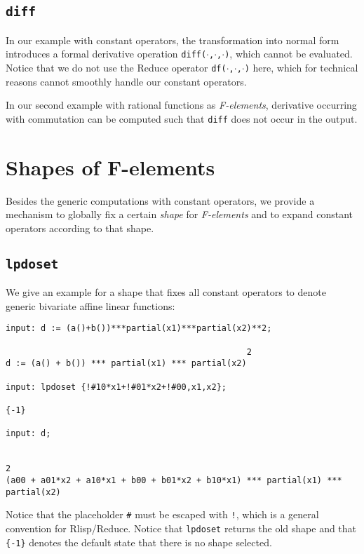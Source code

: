 \documentclass[a4paper]{article}
\begin{document}
\subsection{\texttt{diff}}
In our example with constant operators, the transformation into normal
form introduces a formal derivative operation
\texttt{diff($\cdot$,$\cdot$,$\cdot$)}, which cannot be evaluated.
Notice that we do not use the Reduce operator
\texttt{df($\cdot$,$\cdot$,$\cdot$)} here, which for technical reasons
cannot smoothly handle our constant operators.

In our second example with rational functions as \textit{F-elements},
derivative occurring with commutation can be computed such that
\texttt{diff} does not occur in the output.

\section{Shapes of F-elements}
Besides the generic computations with constant operators, we provide a
mechanism to globally fix a certain \emph{shape} for
\textit{F-elements} and to expand constant operators according to that
shape.
\subsection{\texttt{lpdoset}}
We give an example for a shape that fixes all constant operators to
denote generic bivariate affine linear functions:

\begin{footnotesize}
\begin{verbatim}
input: d := (a()+b())***partial(x1)***partial(x2)**2;

                                                2
d := (a() + b()) *** partial(x1) *** partial(x2)

input: lpdoset {!#10*x1+!#01*x2+!#00,x1,x2};

{-1}

input: d;

                                                                               2
(a00 + a01*x2 + a10*x1 + b00 + b01*x2 + b10*x1) *** partial(x1) *** partial(x2)
\end{verbatim}
\end{footnotesize}
Notice that the placeholder \texttt{\#} must be escaped with
\texttt{!}, which is a general convention for Rlisp/Reduce. Notice
that \texttt{lpdoset} returns the old shape and that \texttt{\{-1\}}
denotes the default state that there is no shape selected.
\end{document}
